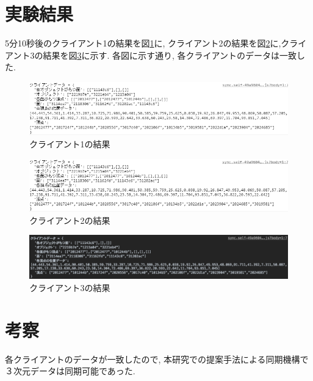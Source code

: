 \section{実験結果}
5分10秒後のクライアント1の結果を図\ref{kekka1}に, クライアント2の結果を図\ref{kekka2}に,クライアント3の結果を図\ref{kekka3}に示す.
各図に示す通り, 各クライアントのデータは一致した.
\begin{figure}[htbp]
 \begin{center}
	 \includegraphics[scale=0.7]{images/kekka1}
	 \caption{クライアント1の結果}
	 \label{kekka1}
 \end{center}
\end{figure}
\begin{figure}[htbp]
 \begin{center}
	 \includegraphics[scale=0.7]{images/kekka2}
	 \caption{クライアント2の結果}
	 \label{kekka2}
 \end{center}
\end{figure}
\begin{figure}[htbp]
 \begin{center}
	 \includegraphics[scale=0.35]{images/kekka3}
	 \caption{クライアント3の結果}
	 \label{kekka3}
 \end{center}
\end{figure}


\section{考察}
各クライアントのデータが一致したので,
本研究での提案手法による同期機構で３次元データは同期可能であった.

